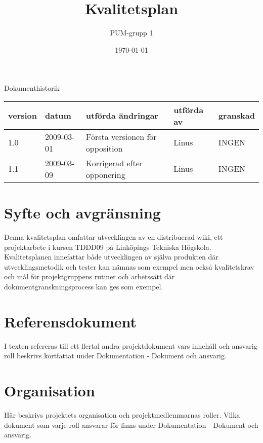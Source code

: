

\ifpdf
\else
\fi

\title{Kvalitetsplan}
\author{PUM-grupp 1}
\date{\today}



\maketitle\thispagestyle{empty}
\newpage

{\centering \Large{Dokumenthistorik\\}}

\vspace{10pt}
\begin{tabularx}{\textwidth}{ |l|l|X|l|l| }
  \hline
    \textbf{version} & \textbf{datum} & \textbf{utförda ändringar} & \textbf{utförda av} & \textbf{granskad} \\
	\hline 
  1.0 & 2009-03-01 & Första versionen för opposition & Linus & INGEN \\
  1.1 & 2009-03-09 & Korrigerad efter opponering & Linus & INGEN \\
  \hline
\end{tabularx}

\newpage

\setcounter{tocdepth}{2}
\tableofcontents
\newpage

\section{Syfte och avgränsning}
Denna kvalitetsplan omfattar utvecklingen av en distribuerad wiki, ett projektarbete i kursen TDDD09 på Linköpings Tekniska Högskola. Kvalitetsplanen innefattar både utvecklingen av själva produkten där utvecklingsmetodik och tester kan nämnas som exempel men också kvalitetskrav och mål för projektgruppens rutiner och arbetssätt där dokumentgranskningsprocess kan ges som exempel. 

\section{Referensdokument}
I texten refereras till ett flertal andra projektdokument vars innehåll och ansvarig roll beskrivs kortfattat under Dokumentation - Dokument och ansvarig.

\section{Organisation}
Här beskrivs projektets organisation och projektmedlemmarnas roller. Vilka dokument som varje roll ansvarar för finns under Dokumentation - Dokument och ansvarig.

